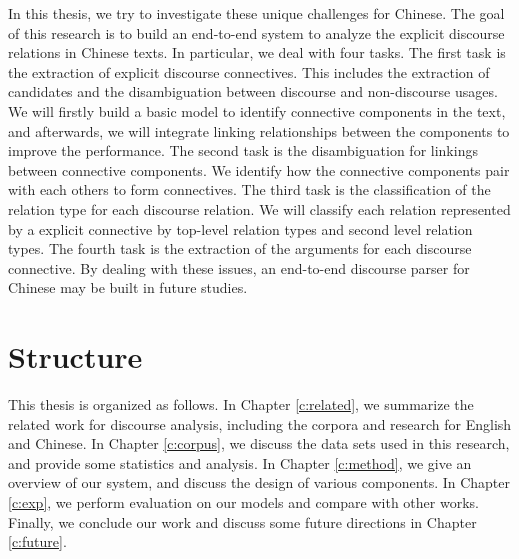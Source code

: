 In this thesis, we try to investigate these unique challenges for Chinese.
The goal of this research is to build an end-to-end system to analyze
the explicit discourse relations in Chinese texts. In particular, we
deal with four tasks. The first task is the extraction of explicit discourse
connectives. This includes the extraction of candidates and the disambiguation
between discourse and non-discourse usages. We will firstly build a basic model
to identify connective components in the text, and afterwards, we will
integrate linking relationships between the components to improve the performance.
The second task is the disambiguation for linkings between connective components.
We identify how the connective components pair with each others to form connectives.
The third task is the classification of the relation type for each discourse relation.
We will classify each relation represented by a explicit connective by top-level
relation types and second level relation types.
The fourth task is the extraction of the arguments for each discourse connective.
By dealing with these issues, an end-to-end discourse parser for Chinese may
be built in future studies.

%
%
\section{Structure}
This thesis is organized as follows. In Chapter \ref{c:related}, we summarize
the related work for discourse analysis, including the corpora and research for
English and Chinese. In Chapter \ref{c:corpus}, we discuss the data sets used in
this research, and provide some statistics and analysis. In Chapter \ref{c:method},
we give an overview of our system, and discuss the design of various components.
In Chapter \ref{c:exp}, we perform evaluation on our models and compare with
other works. Finally, we conclude our work and discuss some future directions in
Chapter \ref{c:future}.
